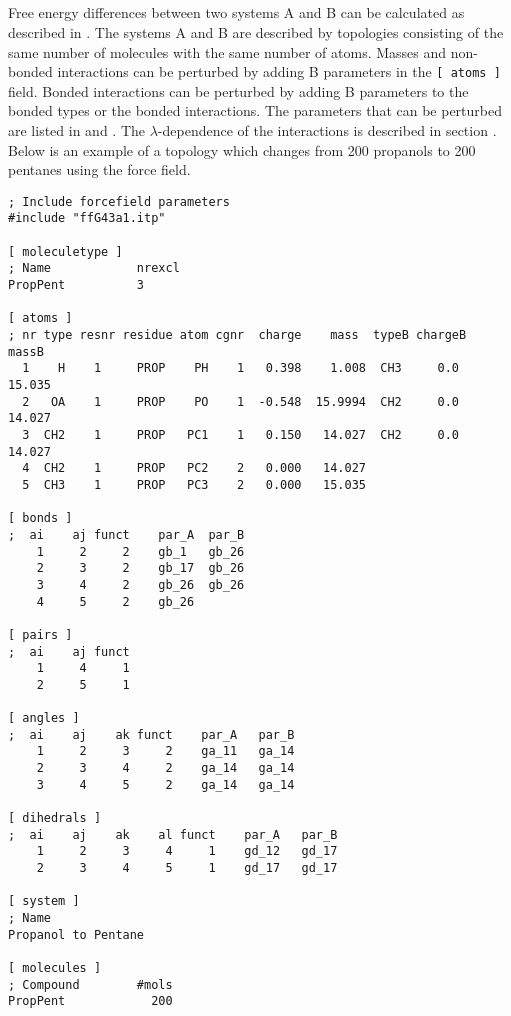 \subsection{}

Free energy differences between two systems A and B can be calculated as
described in .
The systems A and B are described by topologies
consisting of the same number of molecules with the same number of
atoms. Masses and non-bonded interactions can be perturbed by adding B
parameters in the {\tt [~atoms~]} field. Bonded interactions can be 
perturbed by adding B parameters to the bonded types or the bonded
interactions. The parameters that can be perturbed are listed in  
 and .
The $\lambda$-dependence of the interactions is described
in section .
Below is an example of a topology which changes from 200 propanols to
200 pentanes using the  force field.
{\small\begin{verbatim}
; Include forcefield parameters
#include "ffG43a1.itp"

[ moleculetype ]
; Name            nrexcl
PropPent          3

[ atoms ]
; nr type resnr residue atom cgnr  charge    mass  typeB chargeB  massB
  1    H    1     PROP    PH    1   0.398    1.008  CH3     0.0  15.035
  2   OA    1     PROP    PO    1  -0.548  15.9994  CH2     0.0  14.027
  3  CH2    1     PROP   PC1    1   0.150   14.027  CH2     0.0  14.027
  4  CH2    1     PROP   PC2    2   0.000   14.027
  5  CH3    1     PROP   PC3    2   0.000   15.035

[ bonds ]
;  ai    aj funct    par_A  par_B 
    1     2     2    gb_1   gb_26
    2     3     2    gb_17  gb_26
    3     4     2    gb_26  gb_26
    4     5     2    gb_26

[ pairs ]
;  ai    aj funct
    1     4     1
    2     5     1

[ angles ]
;  ai    aj    ak funct    par_A   par_B
    1     2     3     2    ga_11   ga_14
    2     3     4     2    ga_14   ga_14
    3     4     5     2    ga_14   ga_14

[ dihedrals ]
;  ai    aj    ak    al funct    par_A   par_B
    1     2     3     4     1    gd_12   gd_17
    2     3     4     5     1    gd_17   gd_17

[ system ]
; Name
Propanol to Pentane

[ molecules ]
; Compound        #mols
PropPent            200
\end{verbatim}}
